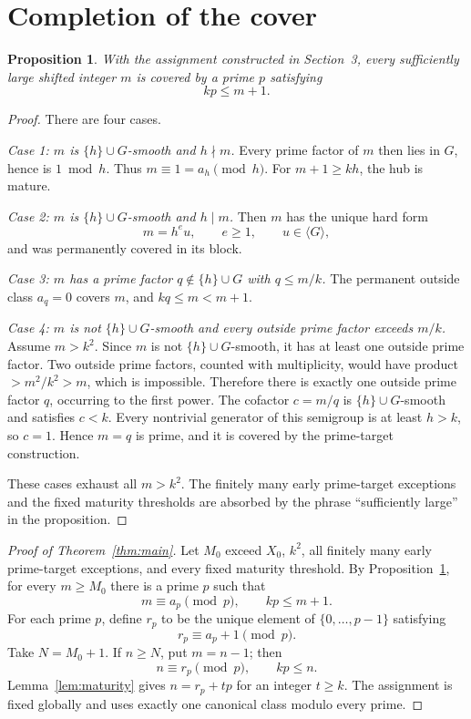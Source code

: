 \documentclass[10pt]{amsart}
\numberwithin{equation}{section}
\newcommand{\Gsem}{\langle G\rangle}
\newtheorem{proposition}[theorem]{Proposition}
\theoremstyle{remark}
\begin{document}
\section{Completion of the cover}

\begin{proposition}\label{prop:completion}
With the assignment constructed in Section~3, every sufficiently large
shifted integer \(m\) is covered by a prime \(p\) satisfying
\[
 kp\le m+1.
\]
\end{proposition}

\begin{proof}
There are four cases.

\smallskip
\noindent\emph{Case 1: \(m\) is \(\{h\}\cup G\)-smooth and \(h\nmid m\).}
Every prime factor of \(m\) then lies in \(G\), hence is \(1\bmod h\).
Thus \(m\equiv1=a_h\pmod h\). For \(m+1\ge kh\), the hub is mature.

\smallskip
\noindent\emph{Case 2: \(m\) is \(\{h\}\cup G\)-smooth and \(h\mid m\).}
Then \(m\) has the unique hard form
\[
 m=h^eu,\qquad e\ge1,\qquad u\in\Gsem,
\]
and was permanently covered in its block.

\smallskip
\noindent\emph{Case 3: \(m\) has a prime factor
\(q\notin\{h\}\cup G\) with \(q\le m/k\).}
The permanent outside class \(a_q=0\) covers \(m\), and
\(kq\le m<m+1\).

\smallskip
\noindent\emph{Case 4: \(m\) is not \(\{h\}\cup G\)-smooth and every
outside prime factor exceeds \(m/k\).}
Assume \(m>k^2\). Since \(m\) is not \(\{h\}\cup G\)-smooth, it has at
least one outside prime factor. Two outside prime factors, counted with
multiplicity, would have product \(>m^2/k^2>m\), which is impossible.
Therefore there is exactly one outside prime factor \(q\), occurring to the
first power. The cofactor \(c=m/q\) is \(\{h\}\cup G\)-smooth and satisfies
\(c<k\). Every nontrivial generator of this semigroup is at least \(h>k\),
so \(c=1\). Hence \(m=q\) is prime, and it is covered by the prime-target
construction.

These cases exhaust all \(m>k^2\). The finitely many early prime-target
exceptions and the fixed maturity thresholds are absorbed by the phrase
``sufficiently large'' in the proposition.
\end{proof}

\begin{proof}[Proof of Theorem~\ref{thm:main}]
Let \(M_0\) exceed \(X_0\), \(k^2\), all finitely many early prime-target
exceptions, and every fixed maturity threshold. By
Proposition~\ref{prop:completion}, for every \(m\ge M_0\) there is a prime
\(p\) such that
\[
 m\equiv a_p\pmod p,\qquad kp\le m+1.
\]
For each prime \(p\), define \(r_p\) to be the unique element of
\(\{0,\ldots,p-1\}\) satisfying
\[
 r_p\equiv a_p+1\pmod p.
\]
Take \(N=M_0+1\). If \(n\ge N\), put \(m=n-1\); then
\[
 n\equiv r_p\pmod p,\qquad kp\le n.
\]
Lemma~\ref{lem:maturity} gives \(n=r_p+tp\) for an integer \(t\ge k\).
The assignment is fixed globally and uses exactly one canonical class
modulo every prime.
\end{proof}
\end{document}
